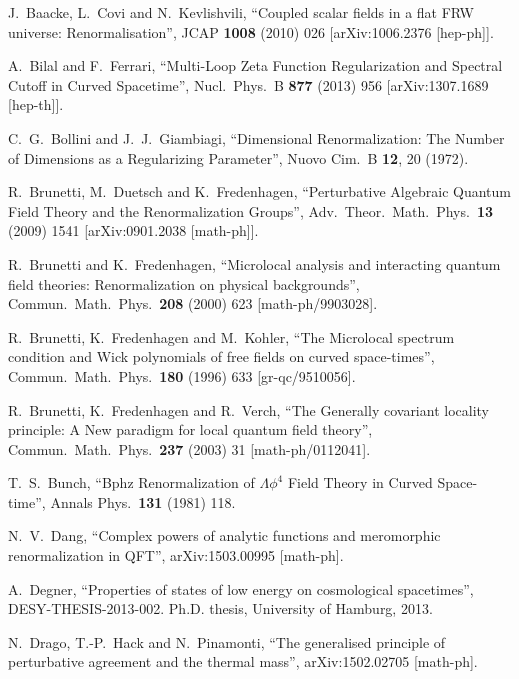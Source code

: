 \documentclass[a4paper,10pt,twoside]{article}
\numberwithin{equation}{section}
\newcounter{and}
\theoremstyle{plain}
\theoremstyle{definition}
\begin{document}
\begin{thebibliography}{100}

  J.~Baacke, L.~Covi and N.~Kevlishvili,
  ``Coupled scalar fields in a flat FRW universe: Renormalisation'',
  JCAP {\bf 1008} (2010) 026
  [arXiv:1006.2376 [hep-ph]].
  
  A.~Bilal and F.~Ferrari,
  ``Multi-Loop Zeta Function Regularization and Spectral Cutoff in Curved Spacetime'',
  Nucl.\ Phys.\ B {\bf 877} (2013) 956
  [arXiv:1307.1689 [hep-th]].  
  
  C.~G.~Bollini and J.~J.~Giambiagi,
  ``Dimensional Renormalization: The Number of Dimensions as a Regularizing Parameter'',
  Nuovo Cim.\ B {\bf 12}, 20 (1972).  
  
  R.~Brunetti, M.~Duetsch and K.~Fredenhagen,
  ``Perturbative Algebraic Quantum Field Theory and the Renormalization Groups'',
  Adv.\ Theor.\ Math.\ Phys.\  {\bf 13} (2009) 1541
  [arXiv:0901.2038 [math-ph]].
  
  R.~Brunetti and K.~Fredenhagen,
  ``Microlocal analysis and interacting quantum field theories: Renormalization on physical backgrounds'',
  Commun.\ Math.\ Phys.\  {\bf 208} (2000) 623
  [math-ph/9903028]. 
  
  R.~Brunetti, K.~Fredenhagen and M.~Kohler,
  ``The Microlocal spectrum condition and Wick polynomials of free fields on curved space-times'',
  Commun.\ Math.\ Phys.\  {\bf 180} (1996) 633
  [gr-qc/9510056]. 
  
  R.~Brunetti, K.~Fredenhagen and R.~Verch,
  ``The Generally covariant locality principle: A New paradigm for local quantum field theory'',
  Commun.\ Math.\ Phys.\  {\bf 237} (2003) 31
  [math-ph/0112041]. 

  T.~S.~Bunch,
  ``Bphz Renormalization of $\Lambda \phi^4$ Field Theory in Curved Space-time'',
  Annals Phys.\  {\bf 131} (1981) 118. 

  N.~V.~Dang,
  ``Complex powers of analytic functions and meromorphic renormalization in QFT'',
  arXiv:1503.00995 [math-ph].
  
  A.~Degner,
  ``Properties of states of low energy on cosmological spacetimes'',
  DESY-THESIS-2013-002.
  Ph.D. thesis, University of Hamburg, 2013. 

  N.~Drago, T.-P.~Hack and N.~Pinamonti, %
  ``The generalised principle of perturbative agreement and the thermal mass'', 
  arXiv:1502.02705 [math-ph].


\end{thebibliography}
\end{document}
